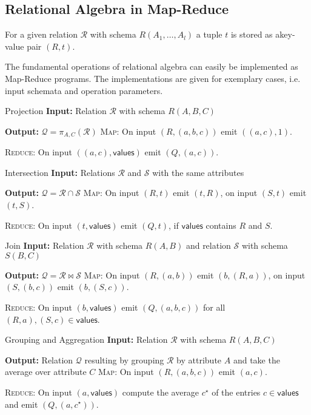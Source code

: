 \documentclass[english]{panikzettel}
\begin{document}

\subsection{Relational Algebra in Map-Reduce}
For a given relation $\mathcal{R}$ with schema $R(A_1, \ldots, A_l)$ a tuple $t$ is stored as akey-value pair $(R,t)$.

The fundamental operations of relational algebra can easily be implemented as Map-Reduce programs. The implementations are given for exemplary cases, i.e. input schemata and operation parameters.

\begin{algo}{Projection}
\textbf{Input:} Relation $\mathcal{R}$ with schema $R(A,B,C)$

\textbf{Output:} $\mathcal{Q} = \pi_{A,C}(\mathcal{R})$
\tcblower
\textsc{Map}: On input $(R,(a,b,c))$ emit $((a,c),1)$.

\textsc{Reduce}: On input $((a,c), \textsf{values})$ emit $(Q,(a,c))$.
\end{algo}

\begin{algo}{Intersection}
\textbf{Input:} Relations $\mathcal{R}$ and $\mathcal{S}$ with the same attributes

\textbf{Output:} $\mathcal{Q} = \mathcal{R} \cap \mathcal{S}$
\tcblower
\textsc{Map}: On input $(R,t)$ emit $(t,R)$, on input $(S,t)$ emit $(t,S)$.

\textsc{Reduce}: On input $(t, \textsf{values})$ emit $(Q,t)$, if $\textsf{values}$ contains $R$ and $S$.
\end{algo}

\begin{algo}{Join}
\textbf{Input:} Relation $\mathcal{R}$ with schema $R(A,B)$ and relation $\mathcal{S}$ with schema $S(B,C)$

\textbf{Output:} $\mathcal{Q} = \mathcal{R} \bowtie \mathcal{S}$
\tcblower
\textsc{Map}: On input $(R,(a,b))$ emit $(b,(R,a))$, on input $(S,(b,c))$ emit $(b,(S,c))$.

\textsc{Reduce}: On input $(b, \textsf{values})$ emit $(Q,(a,b,c))$ for all $(R,a),(S,c) \in \textsf{values}$.
\end{algo}

\begin{algo}{Grouping and Aggregation}
\textbf{Input:} Relation $\mathcal{R}$ with schema $R(A,B,C)$

\textbf{Output:} Relation $\mathcal{Q}$ resulting by grouping $\mathcal{R}$ by attribute $A$ and take the average over attribute $C$
\tcblower
\textsc{Map}: On input $(R,(a,b,c))$ emit $(a,c)$.

\textsc{Reduce}: On input $(a, \textsf{values})$ compute the average $c^\star$ of the entries $c \in \textsf{values}$ and emit $(Q,(a,c^\star))$.
\end{algo}
\end{document}

